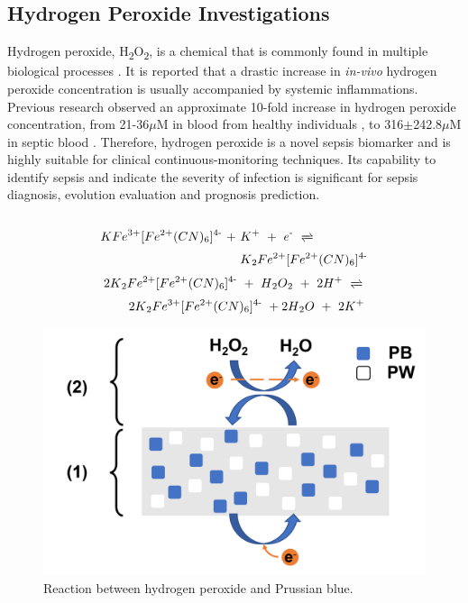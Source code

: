 \subsection{Hydrogen Peroxide Investigations}
Hydrogen peroxide, H\textsubscript{2}O\textsubscript{2}, is a chemical that is commonly found in multiple biological processes \cite{Pravda2014}. It is reported that a drastic increase in \textit{in-vivo} hydrogen peroxide concentration is usually accompanied by systemic inflammations. Previous research observed an approximate 10-fold increase in hydrogen peroxide concentration, from 21-36$\mu$M in blood from healthy individuals \cite{FORMAN201648}, to 316$\pm$242.8$\mu$M in septic blood \cite{VanAsbeck1995}. Therefore, hydrogen peroxide is a novel sepsis biomarker and is highly suitable for clinical continuous-monitoring techniques. Its capability to identify sepsis and indicate the severity of infection is significant for sepsis diagnosis, evolution evaluation and prognosis prediction.\\\\
\begin{align} \label{eqn:h2o2redox1}
    KFe^{3+}[Fe\textsuperscript{2+}(CN)\textsubscript{6}]\textsuperscript{4-} \ + \ & K\textsuperscript{+} \ + \   e\textsuperscript{-} \ \xrightleftharpoons{} \\ \nonumber & K\textsubscript{2}Fe\textsuperscript{2+}[Fe\textsuperscript{2+}(CN)\textsubscript{6}]\textsuperscript{4-}
\end{align}
\begin{align} \label{eqn:h2o2redox2}
    & 2K\textsubscript{2}Fe\textsuperscript{2+}[Fe\textsuperscript{2+}(CN)\textsubscript{6}]\textsuperscript{4-} \ + \  H\textsubscript{2}O\textsubscript{2} \ + \ 2H\textsuperscript{+} \ \xrightleftharpoons{} \\ \nonumber & \quad \quad 2K\textsubscript{2}Fe\textsuperscript{3+}[Fe\textsuperscript{2+}(CN)\textsubscript{6}]\textsuperscript{4-} \ + 2H\textsubscript{2}O \ + \ 2K\textsuperscript{+}
\end{align}
\begin{figure}[H]
    \centering
    \includegraphics[width=.4\textwidth]{img/pb_h2o2.png}
    \caption{Reaction between hydrogen peroxide and Prussian blue.}
    \label{fig:pb_h2o2}
\end{figure}
